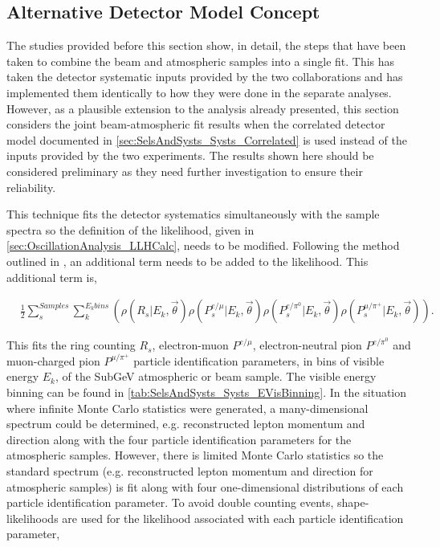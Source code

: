 \clearpage
\subsection{Alternative Detector Model Concept}
\label{sec:AlternativeDetectorModel}

The studies provided before this section show, in detail, the steps that have been taken to combine the beam and atmospheric samples into a single fit. This has taken the detector systematic inputs provided by the two collaborations and has implemented them identically to how they were done in the separate analyses. However, as a plausible extension to the analysis already presented, this section considers the joint beam-atmospheric fit results when the correlated detector model documented in \autoref{sec:SelsAndSysts_Systs_Correlated} is used instead of the inputs provided by the two experiments. The results shown here should be considered preliminary as they need further investigation to ensure their reliability.

This technique fits the detector systematics simultaneously with the sample spectra so the definition of the likelihood, given in \autoref{sec:OscillationAnalysis_LLHCalc}, needs to be modified. Following the method outlined in \cite{thesis_xiaoyue}, an additional term needs to be added to the likelihood. This additional term is,

\begin{equation}
  \label{eqn:Likelihood:Likelihood_CorrelatedDetectorModel}
  \begin{split}
    & \frac{1}{2} \sum^{Samples}_s \sum^{E_{k} bins}_{k} \left(\rho(R_s | E_k, \vec{\theta}) \rho(P^{e/\mu}_s | E_k, \vec{\theta}) \rho(P^{e/\pi^0}_s | E_k, \vec{\theta}) \rho(P^{\mu/\pi^+}_s | E_k, \vec{\theta}) \right).
  \end{split}
\end{equation}

This fits the ring counting $R_s$, electron-muon $P^{e/\mu}$, electron-neutral pion $P^{e/\pi^0}$ and muon-charged pion $P^{\mu/\pi^+}$ particle identification parameters, in bins of visible energy $E_k$, of the  SubGeV atmospheric or beam sample. The visible energy binning can be found in \autoref{tab:SelsAndSysts_Systs_EVisBinning}. In the situation where infinite Monte Carlo statistics were generated, a many-dimensional spectrum could be determined, e.g. reconstructed lepton momentum and direction along with the four particle identification parameters for the atmospheric samples. However, there is limited Monte Carlo statistics so the standard spectrum (e.g. reconstructed lepton momentum and direction for atmospheric samples) is fit along with four one-dimensional distributions of each particle identification parameter. To avoid double counting events, shape-likelihoods are used for the likelihood associated with each particle identification parameter,

